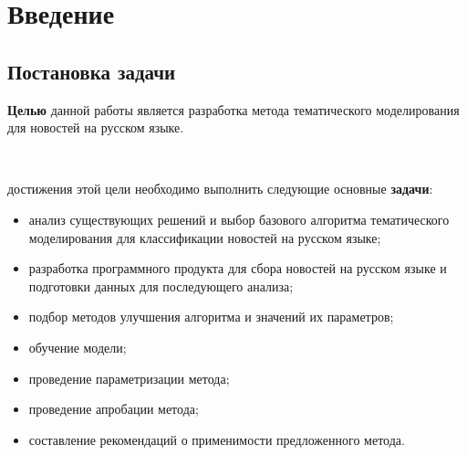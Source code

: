 \chapter{Введение}



%
\section{Постановка задачи}

\noindent\textbf{Целью} данной работы является разработка метода тематического моделирования для новостей на русском языке.

~\

 достижения этой цели необходимо выполнить следующие основные \textbf{задачи}:

\begin{itemize}
    \item анализ существующих решений и выбор базового алгоритма тематического моделирования для классификации новостей на русском языке;
    \item разработка программного продукта для сбора новостей на русском языке и подготовки данных для последующего анализа;
    \item подбор методов улучшения алгоритма и значений их параметров;
    \item обучение модели;
    \item проведение параметризации метода;
    \item проведение апробации метода;
    \item составление рекомендаций о применимости предложенного метода.
\end{itemize}


